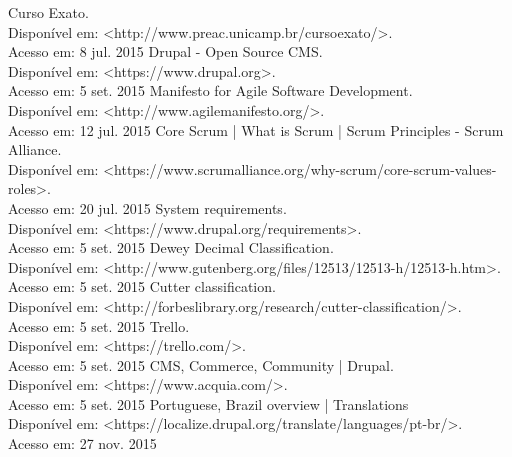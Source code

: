 \documentclass[a4paper]{article}
\begin{document}
\pagebreak
\begin{thebibliography}{9}
 Curso Exato.\\Disponível em: <http://www.preac.unicamp.br/cursoexato/>.\\Acesso em: 8 jul. 2015
 Drupal - Open Source CMS.\\Disponível em: <https://www.drupal.org>.\\Acesso em: 5 set. 2015
 Manifesto for Agile Software Development.\\Disponível em: <http://www.agilemanifesto.org/>.\\Acesso em: 12 jul. 2015
 Core Scrum | What is Scrum | Scrum Principles - Scrum Alliance.\\ Disponível em: <https://www.scrumalliance.org/why-scrum/core-scrum-values-roles>. \\Acesso em: 20 jul. 2015
 System requirements.\\Disponível em: <https://www.drupal.org/requirements>.\\Acesso em: 5 set. 2015
 Dewey Decimal Classification.\\Disponível em: <http://www.gutenberg.org/files/12513/12513-h/12513-h.htm>.\\Acesso em: 5 set. 2015
 Cutter classification.\\Disponível em: <http://forbeslibrary.org/research/cutter-classification/>.\\Acesso em: 5 set. 2015
 Trello.\\Disponível em: <https://trello.com/>.\\Acesso em: 5 set. 2015
 CMS, Commerce, Community | Drupal.\\Disponível em: <https://www.acquia.com/>.\\Acesso em: 5 set. 2015
 Portuguese, Brazil overview | Translations\\Disponível em: <https://localize.drupal.org/translate/languages/pt-br/>.\\Acesso em: 27 nov. 2015

\end{thebibliography}
\end{document}

